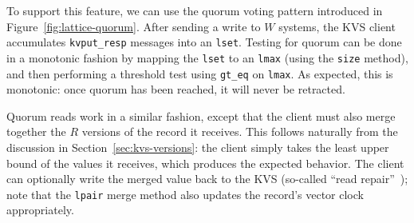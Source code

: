 To support this feature, we can use the \lang quorum voting pattern
introduced in Figure~\ref{fig:lattice-quorum}. After sending a write to $W$
systems, the KVS client accumulates \texttt{kvput\_resp} messages into an
\texttt{lset}. Testing for quorum can be done in a monotonic fashion by mapping
the \texttt{lset} to an \texttt{lmax} (using the \texttt{size} method), and then
performing a threshold test using \texttt{gt\_eq} on \texttt{lmax}. As expected,
this is monotonic: once quorum has been reached, it will never be retracted.

Quorum reads work in a similar fashion, except that the client must also merge
together the $R$ versions of the record it receives. This follows naturally from
the discussion in Section~\ref{sec:kvs-versions}: the client simply takes the
least upper bound of the values it receives, which produces the expected
behavior. The client can optionally write the merged value back to the KVS
(so-called ``read repair''~\cite{DeCandia2007}); note that the \texttt{lpair}
merge method also updates the record's vector clock appropriately.